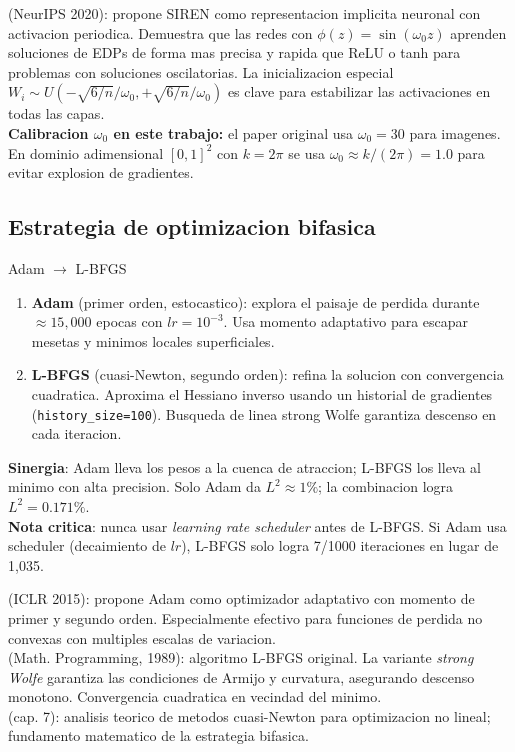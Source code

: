 \documentclass[12pt,a4paper]{article}
\newcommand{\code}[1]{\texttt{\color{azulujat}#1}}
\begin{document}
\begin{litbox}
\textbf{\textcite{sitzmann2020}} (NeurIPS 2020): propone SIREN como
representacion implicita neuronal con activacion periodica. Demuestra que las
redes con $\phi(z) = \sin(\omega_0 z)$ aprenden soluciones de EDPs de forma
mas precisa y rapida que ReLU o tanh para problemas con soluciones oscilatorias.
La inicializacion especial $W_i \sim U(-\sqrt{6/n}/\omega_0, +\sqrt{6/n}/\omega_0)$
es clave para estabilizar las activaciones en todas las capas.\\[4pt]
\textbf{Calibracion $\omega_0$ en este trabajo:} el paper original usa $\omega_0 = 30$
para imagenes. En dominio adimensional $[0,1]^2$ con $k = 2\pi$ se usa
$\omega_0 \approx k/(2\pi) = 1.0$ para evitar explosion de gradientes.
\end{litbox}

\subsection{Estrategia de optimizacion bifasica}

\begin{definbox}{Adam $\to$ L-BFGS}
\begin{enumerate}
  \item \textbf{Adam} (primer orden, estocastico): explora el paisaje de perdida
        durante $\approx15{,}000$ epocas con $lr = 10^{-3}$. Usa momento adaptativo
        para escapar mesetas y minimos locales superficiales.
  \item \textbf{L-BFGS} (cuasi-Newton, segundo orden): refina la solucion con
        convergencia cuadratica. Aproxima el Hessiano inverso usando un historial
        de gradientes (\code{history\_size=100}). Busqueda de linea strong Wolfe
        garantiza descenso en cada iteracion.
\end{enumerate}
\textbf{Sinergia}: Adam lleva los pesos a la cuenca de atraccion; L-BFGS los
lleva al minimo con alta precision. Solo Adam da $L^2 \approx 1\%$; la combinacion
logra $L^2 = 0.171\%$.\\[4pt]
\textbf{Nota critica}: nunca usar \emph{learning rate scheduler} antes de L-BFGS.
Si Adam usa scheduler (decaimiento de $lr$), L-BFGS solo logra 7/1000 iteraciones
en lugar de 1,035.
\end{definbox}

\begin{litbox}
\textbf{\textcite{kingma2015}} (ICLR 2015): propone Adam como optimizador
adaptativo con momento de primer y segundo orden. Especialmente efectivo para
funciones de perdida no convexas con multiples escalas de variacion.\\[4pt]
\textbf{\textcite{liu1989}} (Math. Programming, 1989): algoritmo L-BFGS original.
La variante \emph{strong Wolfe} garantiza las condiciones de Armijo y curvatura,
asegurando descenso monotono. Convergencia cuadratica en vecindad del minimo.\\[4pt]
\textbf{\textcite{nocedal2006}} (cap. 7): analisis teorico de metodos cuasi-Newton
para optimizacion no lineal; fundamento matematico de la estrategia bifasica.
\end{litbox}
\end{document}
